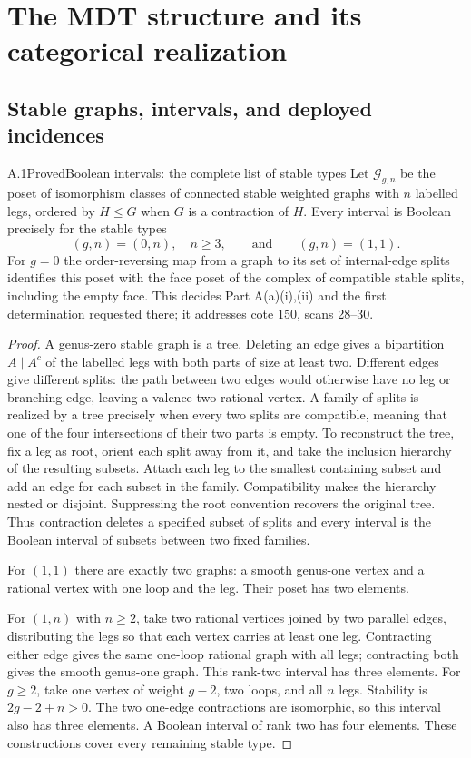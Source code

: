 \section{The MDT structure and its categorical realization}

\subsection{Stable graphs, intervals, and deployed incidences}

\begin{result}{A.1}{Proved}{Boolean intervals: the complete list of stable types}
Let $\mathcal G_{g,n}$ be the poset of isomorphism classes of connected stable weighted graphs with $n$ labelled legs, ordered by $H\leq G$ when $G$ is a contraction of $H$. Every interval is Boolean precisely for the stable types
\[
 (g,n)=(0,n),\quad n\geq3,\qquad\text{and}\qquad(g,n)=(1,1).
\]
For $g=0$ the order-reversing map from a graph to its set of internal-edge splits identifies this poset with the face poset of the complex of compatible stable splits, including the empty face.
This decides Part A(a)(i),(ii) and the first determination requested there; it addresses cote 150, scans 28--30.
\end{result}
\begin{proof}
A genus-zero stable graph is a tree. Deleting an edge gives a bipartition $A\mid A^c$ of the labelled legs with both parts of size at least two. Different edges give different splits: the path between two edges would otherwise have no leg or branching edge, leaving a valence-two rational vertex. A family of splits is realized by a tree precisely when every two splits are compatible, meaning that one of the four intersections of their two parts is empty. To reconstruct the tree, fix a leg as root, orient each split away from it, and take the inclusion hierarchy of the resulting subsets. Attach each leg to the smallest containing subset and add an edge for each subset in the family. Compatibility makes the hierarchy nested or disjoint. Suppressing the root convention recovers the original tree. Thus contraction deletes a specified subset of splits and every interval is the Boolean interval of subsets between two fixed families.

For $(1,1)$ there are exactly two graphs: a smooth genus-one vertex and a rational vertex with one loop and the leg. Their poset has two elements.

For $(1,n)$ with $n\geq2$, take two rational vertices joined by two parallel edges, distributing the legs so that each vertex carries at least one leg. Contracting either edge gives the same one-loop rational graph with all legs; contracting both gives the smooth genus-one graph. This rank-two interval has three elements. For $g\geq2$, take one vertex of weight $g-2$, two loops, and all $n$ legs. Stability is $2g-2+n>0$. The two one-edge contractions are isomorphic, so this interval also has three elements. A Boolean interval of rank two has four elements. These constructions cover every remaining stable type.
\end{proof}




